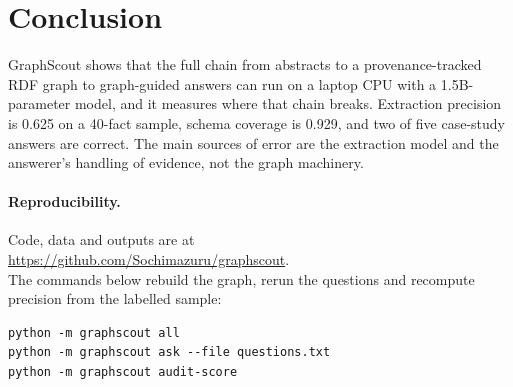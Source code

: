 \documentclass[11pt]{article}
\begin{document}
\section{Conclusion}
GraphScout shows that the full chain from abstracts to a provenance-tracked RDF graph to graph-guided answers can run on a laptop CPU with a 1.5B-parameter model, and it measures where that chain breaks. Extraction precision is 0.625 on a 40-fact sample, schema coverage is 0.929, and two of five case-study answers are correct. The main sources of error are the extraction model and the answerer's handling of evidence, not the graph machinery.

\paragraph{Reproducibility.} Code, data and outputs are at\\ \url{https://github.com/Sochimazuru/graphscout}.\\ The commands below rebuild the graph, rerun the questions and recompute precision from the labelled sample:
\begin{verbatim}
python -m graphscout all
python -m graphscout ask --file questions.txt
python -m graphscout audit-score
\end{verbatim}
\end{document}

